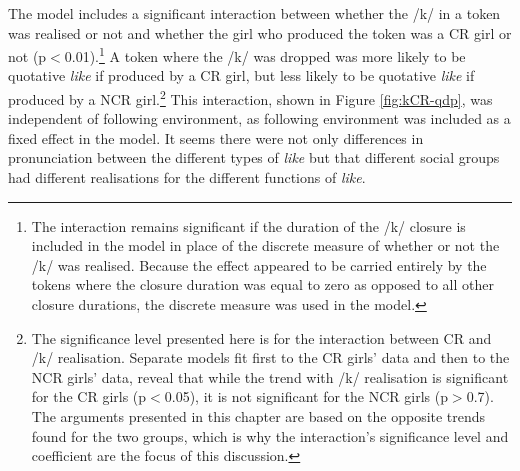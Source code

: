 The model includes a significant interaction between whether the /k/ in a token was realised or not and whether the girl who produced the token was a CR girl or not (p$<$0.01).\footnote{The interaction remains significant if the duration of the /k/ closure is included in the model in place of the discrete measure of whether or not the /k/ was realised.  Because the effect appeared to be carried entirely by the tokens where the closure duration was equal to zero as opposed to all other closure durations, the discrete measure was used in the model.}  A token where the /k/ was dropped was more likely to be quotative \textit{like} if produced by a CR girl, but less likely to be quotative \textit{like} if produced by a NCR girl.\footnote{The significance level presented here is for the interaction between CR and /k/ realisation.  Separate models fit first to the CR girls' data and then to the NCR girls' data, reveal that while the trend with /k/ realisation is significant for the CR girls (p$<$0.05), it is not significant for the NCR girls (p$>$0.7).  The arguments presented in this chapter are based on the opposite trends found for the two groups, which is why the interaction's significance level and coefficient are the focus of this discussion.}  This interaction, shown in Figure \ref{fig:kCR-qdp}, was independent of following environment, as following environment was included as a fixed effect in the model.  It seems there were not only differences in pronunciation between the different types of \textit{like} but that different social groups had different realisations for the different functions of \textit{like}.  


